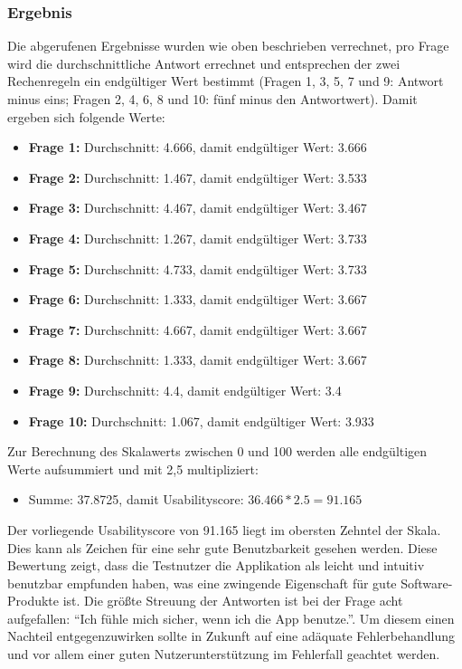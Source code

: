 		\subsubsection{Ergebnis}
		Die abgerufenen Ergebnisse wurden wie oben beschrieben verrechnet, pro Frage wird die durchschnittliche Antwort errechnet und entsprechen der zwei Rechenregeln ein endgültiger Wert bestimmt (Fragen 1, 3, 5, 7 und 9: Antwort minus eins; Fragen 2, 4, 6, 8 und 10: fünf minus den Antwortwert). Damit ergeben sich folgende Werte:
		
		\begin{itemize}
			\item \textbf{Frage 1:} Durchschnitt: 4.666, damit endgültiger Wert: 3.666
			\item \textbf{Frage 2:} Durchschnitt: 1.467, damit endgültiger Wert: 3.533
			\item \textbf{Frage 3:} Durchschnitt: 4.467, damit endgültiger Wert: 3.467
			\item \textbf{Frage 4:} Durchschnitt: 1.267, damit endgültiger Wert: 3.733
			\item \textbf{Frage 5:} Durchschnitt: 4.733, damit endgültiger Wert: 3.733
			\item \textbf{Frage 6:} Durchschnitt: 1.333, damit endgültiger Wert: 3.667
			\item \textbf{Frage 7:} Durchschnitt: 4.667, damit endgültiger Wert: 3.667
			\item \textbf{Frage 8:} Durchschnitt: 1.333, damit endgültiger Wert: 3.667
			\item \textbf{Frage 9:} Durchschnitt: 4.4, damit endgültiger Wert: 3.4
			\item \textbf{Frage 10:} Durchschnitt: 1.067, damit endgültiger Wert: 3.933
		\end{itemize}
	
	Zur Berechnung des Skalawerts zwischen 0 und 100 werden alle endgültigen Werte aufsummiert und mit 2,5 multipliziert:
	
	\begin{itemize}
		\item Summe: 37.8725, damit Usabilityscore: $36.466*2.5=91.165$
	\end{itemize}

	Der vorliegende Usabilityscore von 91.165 liegt im obersten Zehntel der Skala. Dies kann als Zeichen für eine sehr gute Benutzbarkeit gesehen werden. Diese Bewertung zeigt, dass die Testnutzer die Applikation als leicht und intuitiv benutzbar empfunden haben, was eine zwingende Eigenschaft für gute Software-Produkte ist. Die größte Streuung der Antworten ist bei der Frage acht aufgefallen: \enquote{Ich fühle mich sicher, wenn ich die App benutze.}. Um diesem einen Nachteil entgegenzuwirken sollte in Zukunft auf eine adäquate Fehlerbehandlung und vor allem einer guten Nutzerunterstützung im Fehlerfall geachtet werden.
	
